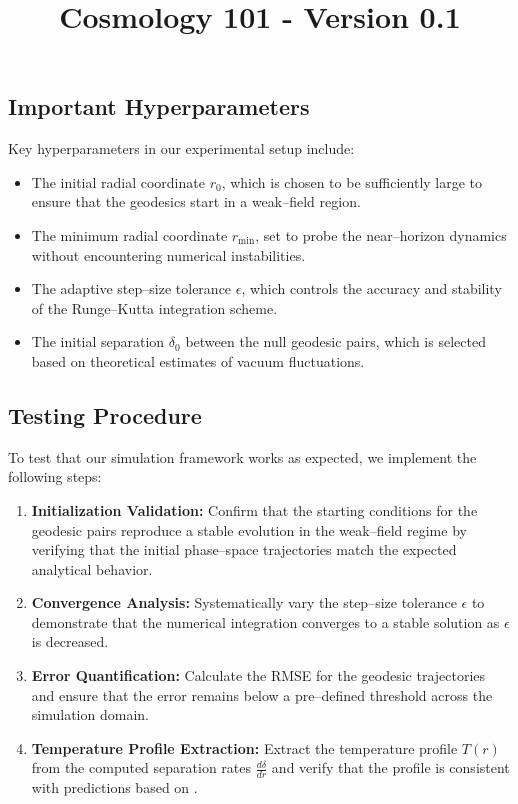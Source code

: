 \documentclass{article}\usepackage{graphicx} \usepackage{amsmath} \usepackage{colortbl}\title{Cosmology 101 - Version 0.1}
\begin{document}
\subsection{Important Hyperparameters}
Key hyperparameters in our experimental setup include:
\begin{itemize}
    \item The initial radial coordinate $r_{0}$, which is chosen to be sufficiently large to ensure that the geodesics start in a weak--field region.
    \item The minimum radial coordinate $r_{\mathrm{min}}$, set to probe the near--horizon dynamics without encountering numerical instabilities.
    \item The adaptive step--size tolerance $\epsilon$, which controls the accuracy and stability of the Runge--Kutta integration scheme.
    \item The initial separation $\delta_{0}$ between the null geodesic pairs, which is selected based on theoretical estimates of vacuum fluctuations.
\end{itemize}

\subsection{Testing Procedure}
To test that our simulation framework works as expected, we implement the following steps:
\begin{enumerate}
    \item \textbf{Initialization Validation:} Confirm that the starting conditions for the geodesic pairs reproduce a stable evolution in the weak--field regime by verifying that the initial phase--space trajectories match the expected analytical behavior.
    \item \textbf{Convergence Analysis:} Systematically vary the step--size tolerance $\epsilon$ to demonstrate that the numerical integration converges to a stable solution as $\epsilon$ is decreased.
    \item \textbf{Error Quantification:} Calculate the RMSE for the geodesic trajectories and ensure that the error remains below a pre--defined threshold across the simulation domain.
    \item \textbf{Temperature Profile Extraction:} Extract the temperature profile $T(r)$ from the computed separation rates $\frac{d\delta}{dr}$ and verify that the profile is consistent with predictions based on \cite{Unruh1976}.
\end{enumerate}
\end{document}
